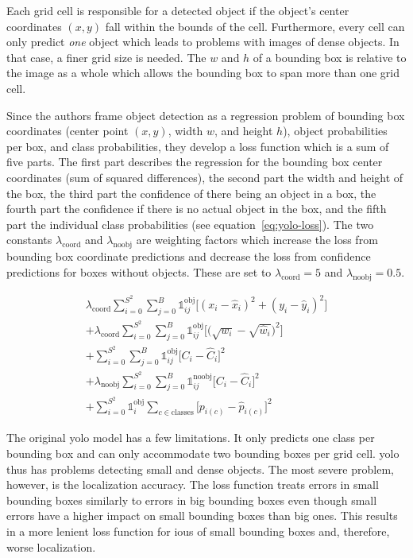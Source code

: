 \documentclass[final]{vutinfth} %
\begin{document}
Each grid cell is responsible for a detected object if the object's
center coordinates $(x,y)$ fall within the bounds of the
cell. Furthermore, every cell can only predict \emph{one} object which
leads to problems with images of dense objects. In that case, a finer
grid size is needed. The $w$ and $h$ of a bounding box is relative to
the image as a whole which allows the bounding box to span more than
one grid cell.

Since the authors frame object detection as a regression problem of
bounding box coordinates (center point $(x,y)$, width $w$, and height
$h$), object probabilities per box, and class probabilities, they
develop a loss function which is a sum of five parts. The first part
describes the regression for the bounding box center coordinates (sum
of squared differences), the second part the width and height of the
box, the third part the confidence of there being an object in a box,
the fourth part the confidence if there is no actual object in the
box, and the fifth part the individual class probabilities (see
equation~\ref{eq:yolo-loss}). The two constants
$\lambda_{\mathrm{coord}}$ and $\lambda_{\mathrm{noobj}}$ are weighting factors
which increase the loss from bounding box coordinate predictions and
decrease the loss from confidence predictions for boxes without
objects. These are set to $\lambda_{\mathrm{coord}} = 5$ and
$\lambda_{{\mathrm{noobj}}} = 0.5$.

\begin{multline}
  \label{eq:yolo-loss}
  \lambda_{\mathrm{coord}}\sum_{i=0}^{S^{2}}\sum_{j=0}^{B}\mathds{1}_{ij}^{\mathrm{obj}}\biggl[ (x_{i} - \hat{x}_{i})^{2} + (y_{i} - \hat{y}_{i})^{2} \biggr] \\
  + \lambda_{\mathrm{coord}}\sum_{i=0}^{S^{2}}\sum_{j=0}^{B}\mathds{1}_{ij}^{\mathrm{obj}}\biggl[ \biggl(\sqrt{w_{i}} - \sqrt{\hat{w}_{i}}\biggr)^{2} \biggr] \\
  + \sum_{i=0}^{S^{2}}\sum_{j=0}^{B}\mathds{1}_{ij}^{\mathrm{obj}}\biggl[ C_{i} - \hat{C}_{i} \biggr]^{2} \\
  + \lambda_{\mathrm{noobj}}\sum_{i=0}^{S^{2}}\sum_{j=0}^{B}\mathds{1}_{ij}^{\mathrm{noobj}}\biggl[ C_{i} - \hat{C}_{i} \biggr]^{2} \\
  + \sum_{i=0}^{S^{2}}\mathds{1}_{i}^{\mathrm{obj}}\sum_{c\in\mathrm{classes}}\biggl[ p_{i(c)} - \hat{p}_{i(c)} \biggr]^{2}
\end{multline}

The original \gls{yolo} model has a few limitations. It only predicts
one class per bounding box and can only accommodate two bounding boxes
per grid cell. \gls{yolo} thus has problems detecting small and dense
objects. The most severe problem, however, is the localization
accuracy. The loss function treats errors in small bounding boxes
similarly to errors in big bounding boxes even though small errors
have a higher impact on small bounding boxes than big ones. This
results in a more lenient loss function for \glspl{iou} of small
bounding boxes and, therefore, worse localization.
\end{document}
